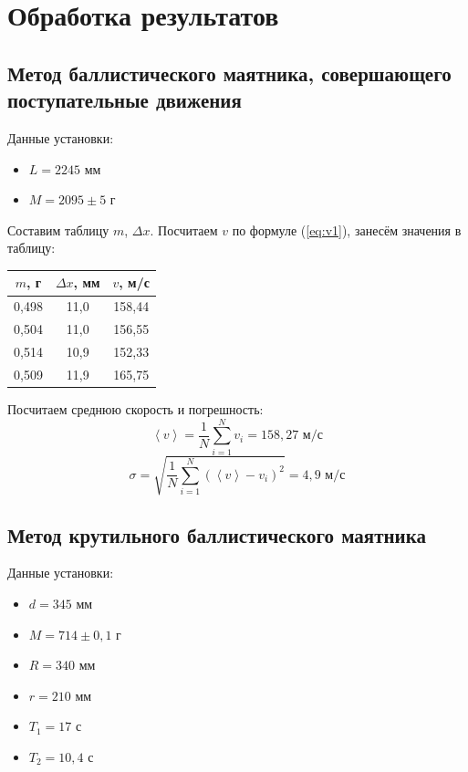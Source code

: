 \documentclass[a4paper, 12pt]{article}
\begin{document}
	\section{Обработка результатов}

		\subsection{Метод баллистического маятника, совершающего поступательные движения}

			Данные установки:
			\begin{itemize}
				\item $L = 2245$ мм
				\item $M = 2095 \pm 5$ г
			\end{itemize}

			Составим таблицу $m$, $\Delta x$. Посчитаем $v$ по формуле (\ref{eq:v1}), занесём значения в таблицу:
			\begin{center}
				\begin{tabular}{|c|c|c|}
					\hline
					$m$, г & $\Delta x$, мм & $v$, м/с \\ \hline
					0,498  & 11,0           & 158,44   \\ \hline
					0,504  & 11,0           & 156,55   \\ \hline
					0,514  & 10,9           & 152,33   \\ \hline
					0,509  & 11,9           & 165,75   \\ \hline
				\end{tabular}
			\end{center}

			Посчитаем среднюю скорость и погрешность:
			\[
				\left<v\right> = \frac{1}{N}\sum_{i = 1}^N v_i = 158,27 \text{ м/с}
			\]
			\[
				\sigma = \sqrt{\frac{1}{N}\sum_{i = 1}^N (\left<v\right> - v_i)^2} = 4,9 \text{ м/с}
			\]

		\subsection{Метод крутильного баллистического маятника}

			Данные установки:
			\begin{itemize}
				\item $d = 345$ мм
				\item $M = 714 \pm 0,1$ г
				\item $R = 340$ мм
				\item $r = 210$ мм
				\item $T_1 = 17$ с
				\item $T_2 = 10,4$ с
			\end{itemize}
\end{document}
